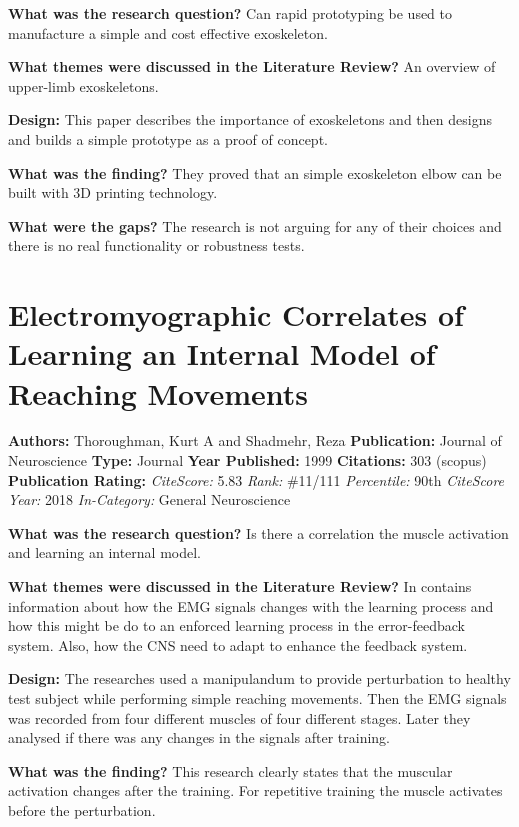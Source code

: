 \textbf{What was the research question?}
Can rapid prototyping be used to manufacture a simple and cost effective exoskeleton. 

\textbf{What themes were discussed in the Literature Review?}  
An overview of upper-limb exoskeletons. 

\textbf{Design:}  
This paper describes the importance of exoskeletons and then designs and builds a simple prototype as a proof of concept. 

\textbf{What was the finding?} 
They proved that an simple exoskeleton elbow can be built with 3D printing technology. 

\textbf{What were the gaps?}  
The research is not arguing for any of their choices and there is no real functionality or robustness tests. 

\section{Electromyographic Correlates of Learning an Internal Model of Reaching Movements} 
\textbf{Authors:} Thoroughman, Kurt A and Shadmehr, Reza \newline
\textbf{Publication:} Journal of Neuroscience
\textbf{Type:} Journal  \newline
\textbf{Year Published:} 1999
\textbf{Citations:} 303 (scopus) \newline 
\textbf{Publication Rating:}    
\textit{CiteScore:} 5.83 \textit{Rank:} \#11/111  \textit{Percentile:} 90th \newline
\textit{CiteScore Year:} 2018
\textit{In-Category:} General Neuroscience

\textbf{What was the research question?}
Is there a correlation the muscle activation and learning an internal model.  

\textbf{What themes were discussed in the Literature Review?}    
In contains information about how the EMG signals changes with the learning process and how this might be do to an enforced learning process in the error-feedback system. Also, how the CNS need to adapt to enhance the feedback system. 

\textbf{Design:}  
The researches used a manipulandum to provide perturbation to healthy test subject while performing simple reaching movements. Then the EMG signals was recorded from four different muscles of four different stages. Later they analysed if there was any changes in the signals after training. 

\textbf{What was the finding?} 
This research clearly states that the muscular activation changes after the training. For repetitive training the muscle activates before the perturbation. 


